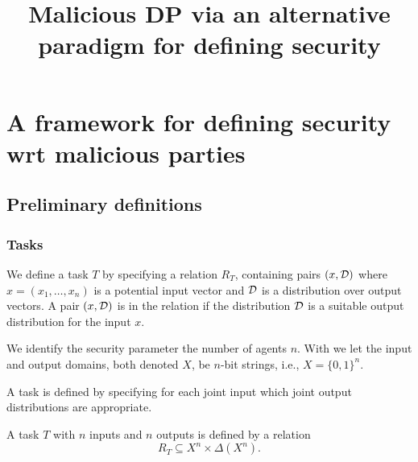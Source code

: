 \documentclass[11pt]{article}
\title{Malicious DP via an alternative paradigm for defining security\Draft{\\{\small \sc Working Draft: Please Please Please Do Not Distribute}}}
\author{}
\begin{document}
	\sloppy
	  \maketitle

\begin{abstract}
\end{abstract}


\section{A framework for defining security wrt malicious parties}

\subsection{Preliminary definitions}

\subsubsection{Tasks} 

We define a task $T$ by specifying a relation $R_T$, containing pairs $(x,{\cal D})$ where $x=(x_1,\ldots,x_n)$ is a potential input vector and ${\cal D}$ is a distribution over output vectors. A pair $(x,{\cal D})$ is in the relation if the distribution ${\cal D}$ is a suitable output distribution for the input $x$.

We identify the security parameter the number of agents $n$. 
With  we let the input and output domains, both denoted $X$, be $n$-bit strings, i.e., $X=\{0,1\}^n$.

A task is defined by specifying for each joint input which joint output distributions are appropriate.
\begin{definition}[Task] A task $T$ with $n$ inputs and $n$ outputs is defined by a relation
$$R_T\subseteq X^n \times \Delta\left(X^n\right).$$
\end{definition}
\end{document}

